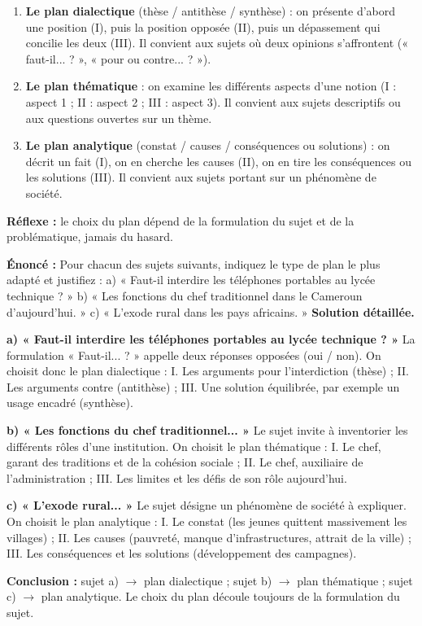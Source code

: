 \documentclass[11pt]{article}
\newcommand{\cle}[1]{{\popxbold\color{popdark}#1}}
\begin{document}
\begin{methode}
\begin{enumerate}
\item \textbf{Le plan dialectique} (thèse / antithèse / synthèse) : on présente d'abord une position (I), puis la position opposée (II), puis un dépassement qui concilie les deux (III). Il convient aux sujets où deux opinions s'affrontent (« faut-il... ? », « pour ou contre... ? »).
\item \textbf{Le plan thématique} : on examine les différents aspects d'une notion (I : aspect 1 ; II : aspect 2 ; III : aspect 3). Il convient aux sujets descriptifs ou aux questions ouvertes sur un thème.
\item \textbf{Le plan analytique} (constat / causes / conséquences ou solutions) : on décrit un fait (I), on en cherche les causes (II), on en tire les conséquences ou les solutions (III). Il convient aux sujets portant sur un phénomène de société.
\end{enumerate}
\textbf{Réflexe :} le choix du plan dépend de la formulation du sujet et de la problématique, jamais du hasard.
\end{methode}

\begin{exoresolu}
\textbf{Énoncé :} Pour chacun des sujets suivants, indiquez le type de plan le plus adapté et justifiez :
a) « Faut-il interdire les téléphones portables au lycée technique ? »
b) « Les fonctions du chef traditionnel dans le Cameroun d'aujourd'hui. »
c) « L'exode rural dans les pays africains. »
\tcblower
\textbf{Solution détaillée.}

\textbf{a) « Faut-il interdire les téléphones portables au lycée technique ? »} La formulation « Faut-il... ? » appelle deux réponses opposées (oui / non). On choisit donc le \cle{plan dialectique} : I. Les arguments pour l'interdiction (thèse) ; II. Les arguments contre (antithèse) ; III. Une solution équilibrée, par exemple un usage encadré (synthèse).

\textbf{b) « Les fonctions du chef traditionnel... »} Le sujet invite à inventorier les différents rôles d'une institution. On choisit le \cle{plan thématique} : I. Le chef, garant des traditions et de la cohésion sociale ; II. Le chef, auxiliaire de l'administration ; III. Les limites et les défis de son rôle aujourd'hui.

\textbf{c) « L'exode rural... »} Le sujet désigne un phénomène de société à expliquer. On choisit le \cle{plan analytique} : I. Le constat (les jeunes quittent massivement les villages) ; II. Les causes (pauvreté, manque d'infrastructures, attrait de la ville) ; III. Les conséquences et les solutions (développement des campagnes).

\textbf{Conclusion :} sujet a) $\rightarrow$ plan dialectique ; sujet b) $\rightarrow$ plan thématique ; sujet c) $\rightarrow$ plan analytique. Le choix du plan découle toujours de la formulation du sujet.
\end{exoresolu}
\end{document}
